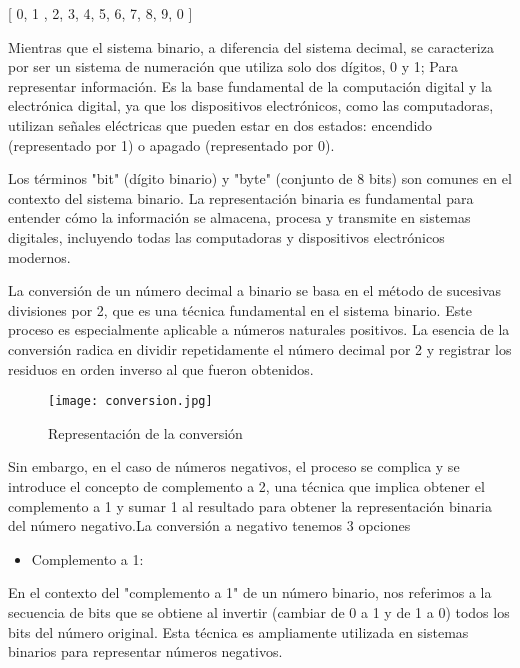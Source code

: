 \documentclass{IEEEcsmag}
\begin{document}
[ 0, 1 , 2, 3, 4, 5, 6, 7, 8, 9, 0 ] 
\newline


Mientras que el sistema binario, a diferencia del sistema decimal, se caracteriza por ser un sistema de numeración que utiliza solo dos dígitos, 0 y 1; Para representar información. Es la base fundamental de la computación digital y la electrónica digital, ya que los dispositivos electrónicos, como las computadoras, utilizan señales eléctricas que pueden estar en dos estados: encendido (representado por 1) o apagado (representado por 0).
\newline

Los términos "bit" (dígito binario) y "byte" (conjunto de 8 bits) son comunes en el contexto del sistema binario. La representación binaria es fundamental para entender cómo la información se almacena, procesa y transmite en sistemas digitales, incluyendo todas las computadoras y dispositivos electrónicos modernos.
\newline 

La conversión de un número decimal a binario se basa en el método de sucesivas divisiones por 2, que es una técnica fundamental en el sistema binario. Este proceso es especialmente aplicable a números naturales positivos. La esencia de la conversión radica en dividir repetidamente el número decimal por 2 y registrar los residuos en orden inverso al que fueron obtenidos.

\begin{figure} 
    \centering
    \texttt{[image: conversion.jpg]}
    \caption{Representación de la conversión}
    \label{fig: Conversion a Binario}
\end{figure}

Sin embargo, en el caso de números negativos, el proceso se complica y se introduce el concepto de complemento a 2, una técnica que implica obtener el complemento a 1 y sumar 1 al resultado para obtener la representación binaria del número negativo.La conversión a negativo tenemos 3 opciones 

\begin{itemize}
    \item Complemento a 1:
\end{itemize}
En el contexto del "complemento a 1" de un número binario, nos referimos a la secuencia de bits que se obtiene al invertir (cambiar de 0 a 1 y de 1 a 0) todos los bits del número original. Esta técnica es ampliamente utilizada en sistemas binarios para representar números negativos.
\newline
\end{document}
